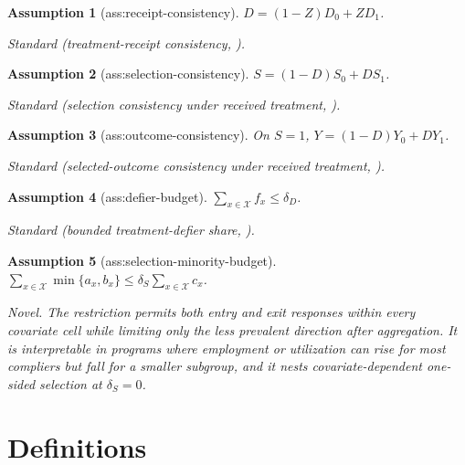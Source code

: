\documentclass{article}
\newtheorem{assumption}{Assumption}
\begin{document}
\begin{assumption}[ass:receipt-consistency]\label{ass:receipt-consistency}
\(D=(1-Z)D_0+ZD_1\).
\par\smallskip\noindent\emph{Standard} (treatment-receipt consistency, \cite{DongHeiler2026}).
\end{assumption}

\begin{assumption}[ass:selection-consistency]\label{ass:selection-consistency}
\(S=(1-D)S_0+DS_1\).
\par\smallskip\noindent\emph{Standard} (selection consistency under received treatment, \cite{DongHeiler2026}).
\end{assumption}

\begin{assumption}[ass:outcome-consistency]\label{ass:outcome-consistency}
On \(S=1\), \(Y=(1-D)Y_0+DY_1\).
\par\smallskip\noindent\emph{Standard} (selected-outcome consistency under received treatment, \cite{DongHeiler2026}).
\end{assumption}

\begin{assumption}[ass:defier-budget]\label{ass:defier-budget}
\(\sum_{x\in\mathcal X}f_x\le\delta_D\).
\par\smallskip\noindent\emph{Standard} (bounded treatment-defier share, \cite{Picchetti2026}).
\end{assumption}

\begin{assumption}[ass:selection-minority-budget]\label{ass:selection-minority-budget}
\(\sum_{x\in\mathcal X}\min\{a_x,b_x\}\le\delta_S\sum_{x\in\mathcal X}c_x\).
\par\smallskip\noindent\emph{Novel.} The restriction permits both entry and exit responses within every covariate cell while limiting only the less prevalent direction after aggregation. It is interpretable in programs where employment or utilization can rise for most compliers but fall for a smaller subgroup, and it nests covariate-dependent one-sided selection at \(\delta_S=0\).
\end{assumption}

\section{Definitions}
\end{document}
